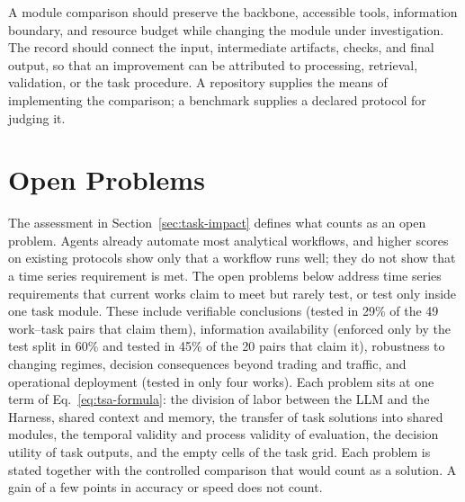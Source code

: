\documentclass[preprints,article,submit,moreauthors]{Definitions/mdpi}
\begin{document}
A module comparison should preserve the backbone, accessible tools, information boundary, and resource budget while changing the module under investigation. The record should connect the input, intermediate artifacts, checks, and final output, so that an improvement can be attributed to processing, retrieval, validation, or the task procedure. A repository supplies the means of implementing the comparison; a benchmark supplies a declared protocol for judging it.
\section{Open Problems}\label{sec:open-problems}


The assessment in Section~\ref{sec:task-impact} defines what counts as an open problem. Agents already automate most analytical workflows, and higher scores on existing protocols show only that a workflow runs well; they do not show that a time series requirement is met. The open problems below address time series requirements that current works claim to meet but rarely test, or test only inside one task module. These include verifiable conclusions (tested in 29\% of the 49 work--task pairs that claim them), information availability (enforced only by the test split in 60\% and tested in 45\% of the 20 pairs that claim it), robustness to changing regimes, decision consequences beyond trading and traffic, and operational deployment (tested in only four works). Each problem sits at one term of Eq.~\eqref{eq:tsa-formula}: the division of labor between the LLM and the Harness, shared context and memory, the transfer of task solutions into shared modules, the temporal validity and process validity of evaluation, the decision utility of task outputs, and the empty cells of the task grid. Each problem is stated together with the controlled comparison that would count as a solution. A gain of a few points in accuracy or speed does not count.
\end{document}
